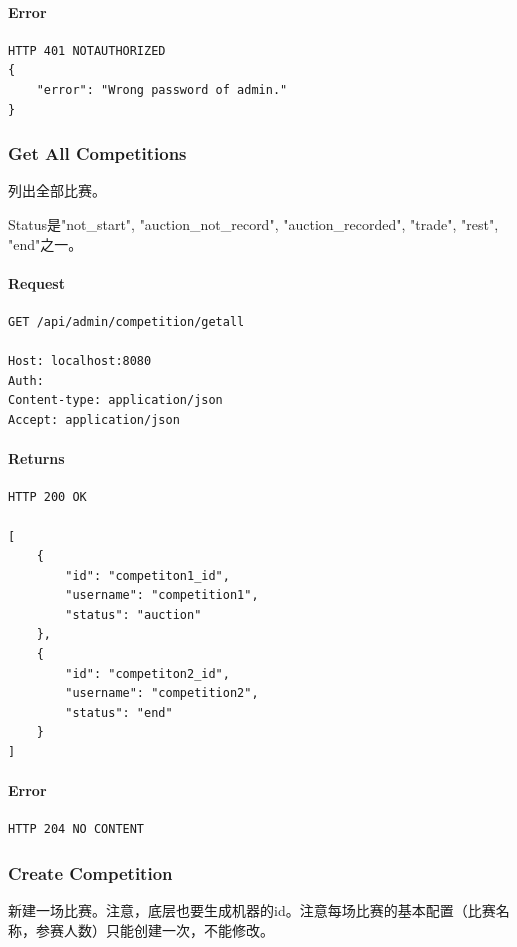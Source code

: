 \documentclass{article}
\begin{document}
\paragraph*{Error}
\begin{lstlisting}
HTTP 401 NOTAUTHORIZED
{
    "error": "Wrong password of admin."
}
\end{lstlisting}


\subsubsection{Get All Competitions}

列出全部比赛。

Status是"not\_start", "auction\_not\_record", "auction\_recorded", "trade", "rest", "end"之一。

\paragraph*{Request}
\begin{lstlisting}
GET /api/admin/competition/getall

Host: localhost:8080
Auth:
Content-type: application/json
Accept: application/json
\end{lstlisting}

\paragraph*{Returns}
\begin{lstlisting}
HTTP 200 OK

[
    {
        "id": "competiton1_id",
        "username": "competition1",
        "status": "auction"
    },
    {
        "id": "competiton2_id",
        "username": "competition2",
        "status": "end"
    }
]
\end{lstlisting}

\paragraph*{Error}
\begin{lstlisting}
HTTP 204 NO CONTENT
\end{lstlisting}

\subsubsection{Create Competition}
新建一场比赛。注意，底层也要生成机器的id。注意每场比赛的基本配置（比赛名称，参赛人数）只能创建一次，不能修改。
\end{document}
